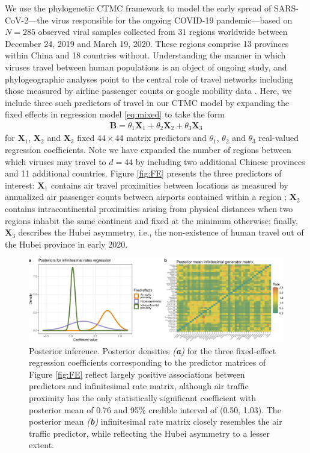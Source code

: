 \documentclass[9pt,twocolumn,twoside]{pnas-new}
\newcommand{\?}{\textbf{?}}
\newcommand{\X}{\textbf{X}}
\newcommand{\B}{\mathbf{B}}
\begin{document}
We use the phylogenetic CTMC framework to model the early spread of
SARS-CoV-2---the virus responsible for the ongoing COVID-19
pandemic---based on $N=285$ observed viral samples collected from $31$
regions worldwide between December 24, 2019 and March 19, 2020. These
regions comprise 13 provinces within China and 18 countries without.
Understanding the manner in which viruses travel between human
populations is an object of ongoing study, and phylogeographic
analyses point to the central role of travel networks including those
measured by airline passenger counts \cite{holbrook2021massive} or
google mobility data \cite{worobey2020emergence}.  Here, we include
three such predictors of travel in our CTMC model by expanding the
fixed effects in regression model \eqref{eq:mixed} to take the form
\begin{align}\label{eq:linear}
	\B = \theta_1 \X_1 + \theta_2  \X_2 + \theta_3 \X_3 
\end{align} 
for $\X_1$, $\X_2$ and $\X_3$ fixed $44\times 44$ matrix predictors and $\theta_1$, $\theta_2$ and $\theta_3$
 real-valued regression coefficients. Note we have expanded the
number of regions between which viruses may travel to $d=44$ by
including two additional Chinese provinces and 11 additional
countries.  Figure \ref{fig:FE} presents the three predictors of
interest: $\X_1$ contains air travel proximities between locations as
measured by annualized air passenger counts between airports contained
within a region \cite{holbrook2021massive}; $\X_2$ contains
intracontinental proximities arising from physical distances when two
regions inhabit the same continent and fixed at the minimum otherwise;
finally, $\X_3$ describes the Hubei asymmetry, i.e., the non-existence
of human travel out of the Hubei province in early 2020.

\begin{figure}[!t]
	\centering
	\includegraphics[width=\linewidth]{postViz.pdf}
	\vspace{-2em}
	\caption{Posterior inference. Posterior densities
          \emph{(\textbf{a})} for the three fixed-effect regression
          coefficients corresponding to the predictor matrices of
          Figure \ref{fig:FE} reflect largely positive associations
          between predictors and infinitesimal rate matrix, although
          air traffic proximity has the only statistically significant
          coefficient with posterior mean of 0.76 and 95\% credible
          interval of (0.50, 1.03).  The posterior mean
          \emph{(\textbf{b})} infinitesimal rate matrix closely
          resembles the air traffic predictor, while reflecting the
          Hubei asymmetry to a lesser extent.}\label{fig:post}
\end{figure}
\end{document}

